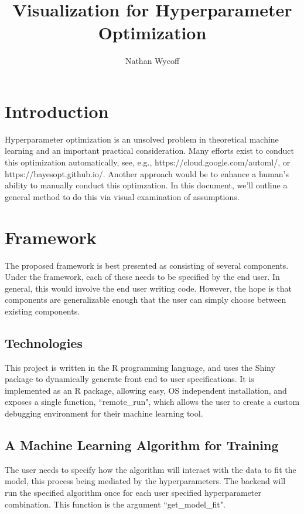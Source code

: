 \documentclass[a4paper]{article}
\title{Visualization for Hyperparameter Optimization}
\author{Nathan Wycoff}
\begin{document}
\maketitle

\section{Introduction}

Hyperparameter optimization is an unsolved problem in theoretical machine learning and an important practical consideration. Many efforts exist to conduct this optimization automatically, see, e.g., https://cloud.google.com/automl/, or https://bayesopt.github.io/. Another approach would be to enhance a human's ability to manually conduct this optimzation. In this document, we'll outline a general method to do this via visual examination of assumptions.

\section{Framework}

The proposed framework is best presented as consisting of several components. Under the framework, each of these needs to be specified by the end user. In general, this would involve the end user writing code. However, the hope is that components are generalizable enough that the user can simply choose between existing components.

\subsection{Technologies}

This project is written in the R programming language, and uses the Shiny package to dynamically generate front end to user specifications. It is implemented as an R package, allowing easy, OS independent installation, and exposes a single function, ``remote\_run", which allows the user to create a custom debugging environment for their machine learning tool.

\subsection{A Machine Learning Algorithm for Training}

The user needs to specify how the algorithm will interact with the data to fit the model, this process being mediated by the hyperparameters. The backend will run the specified algorithm once for each user specified hyperparameter combination. This function is the argument ``get\_model\_fit".
\end{document}
